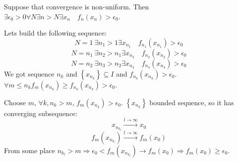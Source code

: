 Suppose that convergence is non-uniform. Then $\exists \epsilon_0 > 0 \forall N \exists n > N \exists x_n \quad f_n(x_n) > \epsilon_0$.

Lets build the following sequence:
$$N=1 \: \exists n_1 > 1 \exists x_{n_1} \quad f_{n_1}(x_{n_1}) > \epsilon_0$$
$$N=n_1 \: \exists n_2 > n_1 \exists x_{n_2} \quad f_{n_2}(x_{n_2}) > \epsilon_0$$
$$N=n_2 \: \exists n_3 > n_2 \exists x_{n_3} \quad f_{n_3}(x_{n_3}) > \epsilon_0$$
We got sequence $n_k$ and $\left\{x_{n_k}\right\} \subseteq I$ and $f_{n_k}(x_{n_k}) > \epsilon_0$. $\forall m \leq n_k f_m(x_{n_k}) \geq f_{n_k}(x_{n_k}) > \epsilon_0$.

Choose $m$, $\forall k, n_k > m$, $f_m(x_{n_k})  > \epsilon_0$.
$\left\{ x_{n_k}\right\}$ bounded sequence, so it has converging subsequence: 
$$x_{n_{k_l} } \stackrel{l \to \infty}{\to} x_0$$
$$f_m\left(x_{n_{k_l} } \right)\stackrel{l \to \infty}{\to} f_m(x_0)$$
From some place $n_{k_l} > m \Rightarrow \epsilon_0 < f_m\left(x_{n_{k_l} } \right) \to f_m(x_0) \Rightarrow f_m(x_0) \geq \epsilon_0$.